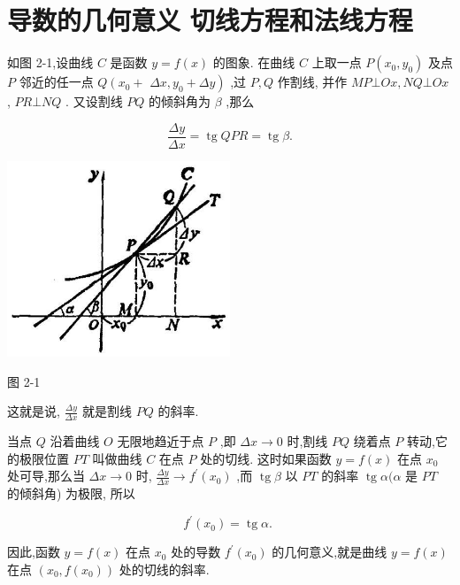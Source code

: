 \documentclass[lang=cn,newtx,10pt,scheme=chinese]{elegantbook}
\begin{document}
\section{导数的几何意义 切线方程和法线方程}

如图 2-1,设曲线 \(C\) 是函数 \(y = f\left( x\right)\) 的图象. 在曲线 \(C\) 上取一点 \(P\left( {{x}_{0},{y}_{0}}\right)\) 及点 \(P\) 邻近的任一点 \(Q\left( {{x}_{0} + }\right.\) \(\left. {{\Delta x},{y}_{0} + {\Delta y}}\right)\) ,过 \(P,Q\) 作割线, 并作 \({MP} \bot {Ox},{NQ} \bot {Ox}\) , \({PR} \bot {NQ}\) . 又设割线 \({PQ}\) 的倾斜角为 \(\beta\) ,那么

\[
\frac{\Delta y}{\Delta x} = \operatorname{tg}{QPR} = \operatorname{tg}\beta .
\]

\begin{center}
\includegraphics[max width=0.5\textwidth]{images/01912c18-5c3f-733d-b775-749ba9897a9d_62_329591.jpg}
\end{center}

图 2-1

这就是说, \(\frac{\Delta y}{\Delta x}\) 就是割线 \({PQ}\) 的斜率.

当点 \(Q\) 沿着曲线 \(O\) 无限地趋近于点 \(P\) ,即 \({\Delta x} \rightarrow 0\) 时,割线 \({PQ}\) 绕着点 \(P\) 转动,它的极限位置 \({PT}\) 叫做曲线 \(C\) 在点 \(P\) 处的切线. 这时如果函数 \(y = f\left( x\right)\) 在点 \({x}_{0}\) 处可导,那么当 \({\Delta x} \rightarrow 0\) 时, \(\frac{\Delta y}{\Delta x} \rightarrow {f}^{\prime }\left( {x}_{0}\right)\) ,而 \(\operatorname{tg}\beta\) 以 \({PT}\) 的斜率 \(\operatorname{tg}\alpha (\alpha\) 是 \({PT}\) 的倾斜角) 为极限, 所以

\[
{f}^{\prime }\left( {x}_{0}\right) = \operatorname{tg}\alpha \text{. }
\]

因此,函数 \(y = f\left( x\right)\) 在点 \({x}_{0}\) 处的导数 \({f}^{\prime }\left( {x}_{0}\right)\) 的几何意义,就是曲线 \(y = f\left( x\right)\) 在点 \(\left( {{x}_{0},f\left( {x}_{0}\right) }\right)\) 处的切线的斜率.
\end{document}
